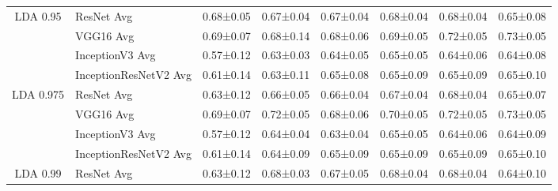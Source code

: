 \begin{landscape}
\begin{table}[]
\begin{tabular}{clllllll}
\multirow{-4}{*}{LDA 0.95}  & ResNet Avg                         & 0.68±0.05                                  & 0.67±0.04                         & 0.67±0.04                         & 0.68±0.04                         & 0.68±0.04                         & 0.65±0.08                         \\
                            & VGG16 Avg                          & 0.69±0.07                                  & 0.68±0.14                         & 0.68±0.06                         & 0.69±0.05                         & 0.72±0.05                         & 0.73±0.05                         \\
                            & InceptionV3 Avg                    & 0.57±0.12                                  & 0.63±0.03                         & 0.64±0.05                         & 0.65±0.05                         & 0.64±0.06                         & 0.64±0.08                         \\
                            & InceptionResNetV2 Avg              & 0.61±0.14                                  & 0.63±0.11                         & 0.65±0.08                         & 0.65±0.09                         & 0.65±0.09                         & 0.65±0.10                         \\
\multirow{-4}{*}{LDA 0.975} & ResNet Avg                         & 0.63±0.12                                  & 0.66±0.05                         & 0.66±0.04                         & 0.67±0.04                         & 0.68±0.04                         & 0.65±0.07                         \\
                            & VGG16 Avg                          & 0.69±0.07                                  & 0.72±0.05                         & 0.68±0.06                         & 0.70±0.05                         & 0.72±0.05                         & 0.73±0.05                         \\
                            & InceptionV3 Avg                    & 0.57±0.12                                  & 0.64±0.04                         & 0.63±0.04                         & 0.65±0.05                         & 0.64±0.06                         & 0.64±0.09                         \\
                            & InceptionResNetV2 Avg              & 0.61±0.14                                  & 0.64±0.09                         & 0.65±0.09                         & 0.65±0.09                         & 0.65±0.09                         & 0.65±0.10                         \\
\multirow{-4}{*}{LDA 0.99}  & ResNet Avg                         & 0.63±0.12                                  & 0.68±0.03                         & 0.67±0.05                         & 0.68±0.04                         & 0.68±0.04                         & 0.64±0.10                        
\end{tabular}
\label{tab:image_classification_reduction_mm}
\end{table}
\end{landscape}

